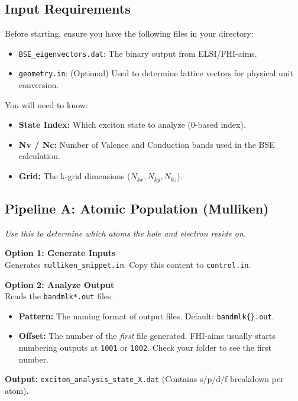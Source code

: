 \documentclass[a4paper,11pt]{article}
\begin{document}
\subsection{Input Requirements}
Before starting, ensure you have the following files in your directory:
\begin{itemize}
    \item \texttt{BSE\_eigenvectors.dat}: The binary output from ELSI/FHI-aims.
    \item \texttt{geometry.in}: (Optional) Used to determine lattice vectors for physical unit conversion.
\end{itemize}
You will need to know:
\begin{itemize}
    \item \textbf{State Index:} Which exciton state to analyze (0-based index).
    \item \textbf{Nv / Nc:} Number of Valence and Conduction bands used in the BSE calculation.
    \item \textbf{Grid:} The k-grid dimensions ($N_{kx}, N_{ky}, N_{kz}$).
\end{itemize}

\subsection{Pipeline A: Atomic Population (Mulliken)}
\textit{Use this to determine which atoms the hole and electron reside on.}

\textbf{Option 1: Generate Inputs} \\
Generates \texttt{mulliken\_snippet.in}. Copy this content to \texttt{control.in}.

\textbf{Option 2: Analyze Output} \\
Reads the \texttt{bandmlk*.out} files.
\begin{itemize}
    \item \textbf{Pattern:} The naming format of output files. Default: \texttt{bandmlk\{\}.out}.
    \item \textbf{Offset:} The number of the \textit{first} file generated. FHI-aims usually starts numbering outputs at \texttt{1001} or \texttt{1002}. Check your folder to see the first number.
\end{itemize}
\textbf{Output:} \texttt{exciton\_analysis\_state\_X.dat} (Contains s/p/d/f breakdown per atom).

\end{document}

